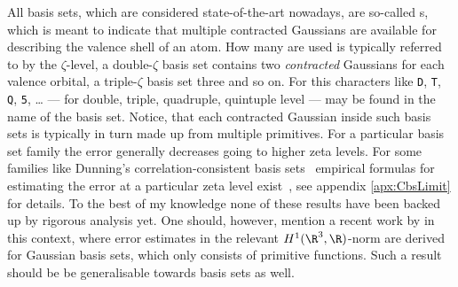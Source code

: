 All basis sets, which are considered state-of-the-art nowadays,
are so-called s,
which is meant to indicate that multiple contracted Gaussians are available
for describing the valence shell of an atom.
How many are used is typically referred to by the $\zeta$-level,
\eg a double-$\zeta$ basis set contains two \emph{contracted} Gaussians
for each valence orbital,
a triple-$\zeta$ basis set three and so on.
For this characters like \texttt{D}, \texttt{T}, \texttt{Q}, \texttt{5}, \ldots
--- for double, triple, quadruple, quintuple level ---
may be found in the name of the basis set.
Notice, that each contracted Gaussian inside such basis sets
is typically in turn made up from multiple primitives.
For a particular basis set family the error generally decreases
going to higher zeta levels.
For some families like Dunning's correlation-consistent
basis sets~\cite{Dunning1989}
empirical formulas for estimating the error at a particular zeta
level exist~\cite{Jensen2005}, see appendix \vref{apx:CbsLimit} for details.
To the best of my knowledge none of these results have been
backed up by rigorous analysis yet.
One should, however, mention a recent work by \citet{Bachmayr2014} in this context,
where error estimates
in the relevant $H^1(\R^3,\R)$-norm are derived for Gaussian basis sets,
which only consists of primitive \GTO functions.
Such a result should be be generalisable towards {\cGTO} basis sets as well.

